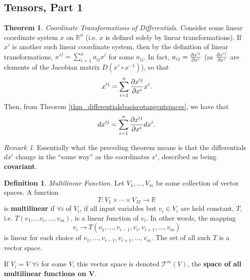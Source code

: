 \documentclass[10pt,landscape]{article}
\theoremstyle{definition}
\newtheorem{definition}{Definition}[section]
\theoremstyle{theorem}
\newtheorem{theorem}{Theorem}[section]
\theoremstyle{summary}
\theoremstyle{remark}
\newtheorem*{remark}{Remark}
\newcommand{\R}{\mathbb{R}}
\newcommand{\Rn}{\mathbb{R}^n}
\begin{document}
\begin{multicols*}{3}
\section{Tensors, Part 1}

\theoremstyle{theorem}
\begin{theorem}{\textit{Coordinate Transformations of Differentials.}}
    \label{thm_coordtransdifferentials}
    Consider some linear coordinate system $x$ on $\Rn$ (i.e. $x$ is defined solely by linear transformations). If $x'$ is another such linear coordinate system, then by the definition of linear transformations, $x'^j=\sum\limits_{i=1}^na_{ij}x^i$ for some $a_{ij}$. In fact, $a_{ij} = \pdv{x'^j}{x^i}$ (as $\pdv{x'^j}{x^i}$ are elements of the Jacobian matrix $D(x'\circ x^{-1})$), so that
    \begin{equation}
        x'^j=\sum\limits_{i=1}^n\pdv{x'^j}{x^i}x^i.
    \end{equation}
    Then, from Theorem \ref{thm_differentialsbasiscotangentspaces}, we have that
    \begin{equation}
        dx'^j=\sum\limits_{i=1}^n\pdv{x'^j}{x^i}dx^i.
    \end{equation}
\end{theorem}

\begin{remark}
    Essentially what the preceding theorem means is that the differentials $dx^i$ change in the ``same way'' as the coordinates $x^i$, described as being \textbf{covariant}.
\end{remark}

\theoremstyle{definition}
\begin{definition}{\textit{Multilinear Function.}}
    Let $V_1,\ldots ,V_m$ be some collection of vector spaces. A function
    \begin{equation}
        T:V_1\times\cdots\times V_M\rightarrow \R
    \end{equation}
    is \textbf{multilinear} if $\forall i$ of $V_i$, if all input variables but $v_i\in V_i$ are held constant, $T$, i.e. $T(v_1,\ldots v_i,\ldots,v_m)$, is a linear function of $v_i$. In other words, the mapping
    \begin{equation}
        v_i\rightarrow T(v_1,\ldots,v_{i-1}, v_i, v_{i+1},\ldots,v_m)
    \end{equation}
    is linear for each choice of $v_1,\ldots,v_{i-1}, v_{i+1},\ldots,v_m$. The set of all such $T$ is a vector space.

    If $V_i=V$ $\forall i$ for some $V$, this vector space is denoted $\mathcal{T}^m(V)$, the \textbf{space of all multilinear functions on $\bm{V}$}.
\end{definition}


\end{multicols*}
\end{document}
